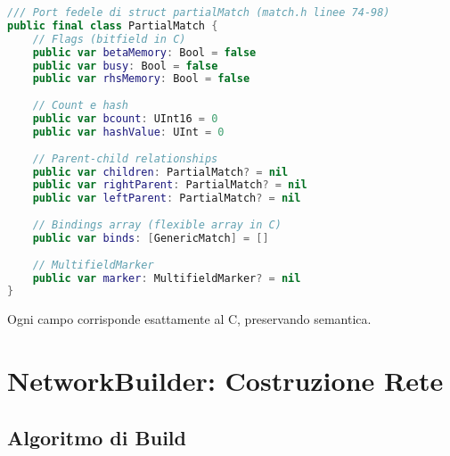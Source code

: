 \begin{lstlisting}[language=Swift]
/// Port fedele di struct partialMatch (match.h linee 74-98)
public final class PartialMatch {
    // Flags (bitfield in C)
    public var betaMemory: Bool = false
    public var busy: Bool = false
    public var rhsMemory: Bool = false
    
    // Count e hash
    public var bcount: UInt16 = 0
    public var hashValue: UInt = 0
    
    // Parent-child relationships
    public var children: PartialMatch? = nil
    public var rightParent: PartialMatch? = nil
    public var leftParent: PartialMatch? = nil
    
    // Bindings array (flexible array in C)
    public var binds: [GenericMatch] = []
    
    // MultifieldMarker
    public var marker: MultifieldMarker? = nil
}
\end{lstlisting}

Ogni campo corrisponde esattamente al C, preservando semantica.

\section{NetworkBuilder: Costruzione Rete}

\subsection{Algoritmo di Build}

